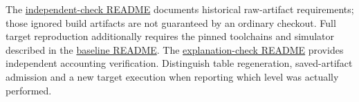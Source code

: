 \documentclass[conference]{IEEEtran}
\begin{document}
The
\href{../fir-sharing-probe/independent-check/README.md}{independent-check
README} documents historical raw-artifact requirements; those ignored
build artifacts are not guaranteed by an ordinary checkout. Full target
reproduction additionally requires the pinned toolchains and simulator
described in the \href{../fir-baseline/README.md}{baseline README}. The
\href{../fir-sharing-probe/explanation-check/README.md}{explanation-check
README} provides independent accounting verification. Distinguish table
regeneration, saved-artifact admission and a new target execution when
reporting which level was actually performed.
\end{document}
